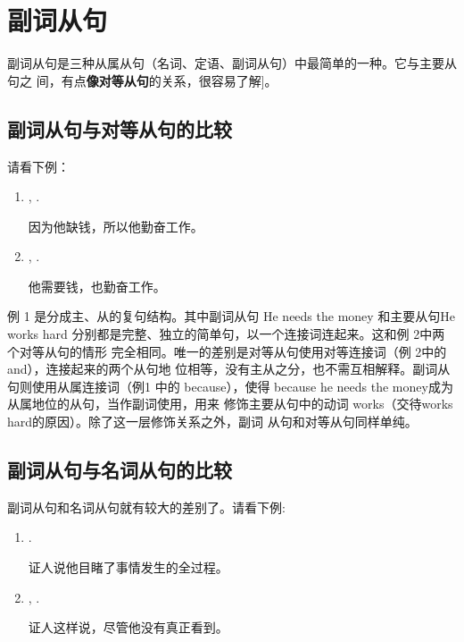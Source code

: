 \chapter{副词从句}

副词从句是三种从属从句（名词、定语、副词从句）中最简单的一种。它与主要从句之
间，有点\textbf{像对等从句}的关系，很容易了解]。

\section{副词从句与对等从句的比较}

请看下例：

\begin{enumerate}
\item {} , .

  因为他缺钱，所以他勤奋工作。
\item {},  .

  他需要钱，也勤奋工作。
\end{enumerate}

例 1 是分成主、从的复句结构。其中副词从句 He needs the money 和主要从句He works
hard 分别都是完整、独立的简单句，以一个连接词连起来。这和例 2中两个对等从句的情形
完全相同。唯一的差别是对等从句使用对等连接词（例 2中的and），连接起来的两个从句地
位相等，没有主从之分，也不需互相解释。副词从句则使用从属连接词（例1 中的
because），使得 because he needs the money成为从属地位的从句，当作副词使用，用来
修饰主要从句中的动词 works（交待works hard的原因）。除了这一层修饰关系之外，副词
从句和对等从句同样单纯。

\section{副词从句与名词从句的比较}

副词从句和名词从句就有较大的差别了。请看下例:

\begin{enumerate}
\item {}   .

  证人说他目睹了事情发生的全过程。
\item {}  , 
  .

  证人这样说，尽管他没有真正看到。
\end{enumerate}

